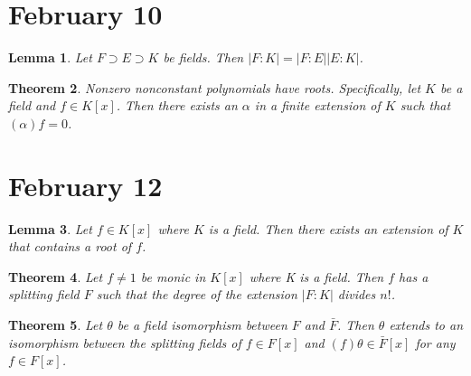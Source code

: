 \documentclass[letterpaper]{article}
\newtheorem{theorem}{Theorem}[section]
\newtheorem{lemma}[theorem]{Lemma}
\begin{document}
\section{February 10}

\begin{lemma}
Let $F \supset E \supset K$ be fields. Then $|F \colon K| = |F \colon E||E \colon K|$.
\end{lemma}

\begin{theorem}
Nonzero nonconstant polynomials have roots. Specifically, let $K$ be a field and $f \in K[x]$. Then there exists an $\alpha$ in a finite extension of $K$ such that $(\alpha)f = 0$.
\end{theorem}

\section{February 12}

\begin{lemma}
Let $f \in K[x]$ where $K$ is a field.  Then there exists an extension of $K$ that contains a root of $f$.
\end{lemma}

\begin{theorem}
Let $f \neq 1$ be monic in $K[x]$ where K is a field.  Then $f$ has a splitting field $F$ such that the degree of the extension $|F \colon K|$  divides $n!$.
\end{theorem}

\begin{theorem}
Let $\theta$ be a field isomorphism between $F$ and $\bar{F}$. Then $\theta$ extends to an isomorphism between the splitting fields of $f \in F[x]$ and $(f) \theta \in \bar{F}[x]$ for any $f \in F[x]$.
\end{theorem}
\end{document}
